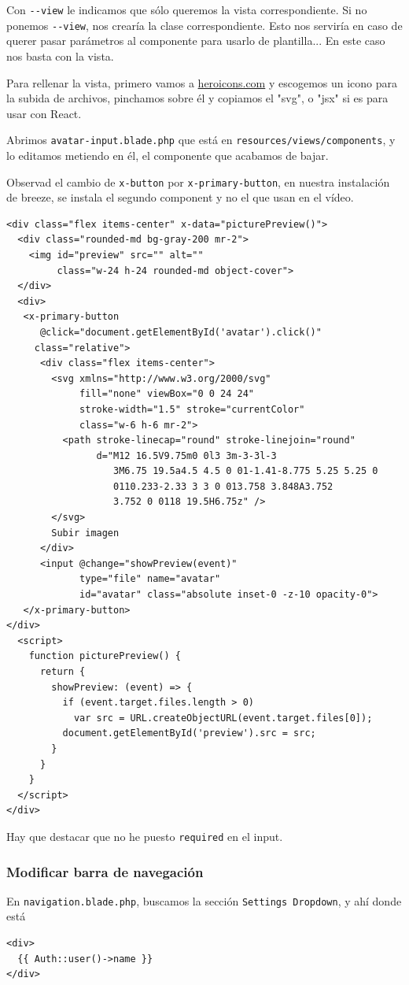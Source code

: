 \documentclass[11pt]{article}
\begin{document}
Con \texttt{-{}-{}view} le indicamos que sólo queremos la vista
correspondiente. Si no ponemos \texttt{-{}-{}view}, nos crearía la clase
correspondiente. Esto nos serviría en caso de querer pasar parámetros
al componente para usarlo de plantilla... En este caso nos basta con
la vista.

Para rellenar la vista, primero vamos a \href{https://heroicons.com/}{heroicons.com} y escogemos un
icono para la subida de archivos, pinchamos sobre él y copiamos el
"svg", o "jsx" si es para usar con React.

Abrimos \texttt{avatar-input.blade.php} que está en
\texttt{resources/views/components}, y lo editamos metiendo en él, el
componente que acabamos de bajar.

Observad el cambio de \texttt{x-button} por \texttt{x-primary-button}, en nuestra
instalación de breeze, se instala el segundo component y no el que
usan en el vídeo.

\begin{verbatim}
<div class="flex items-center" x-data="picturePreview()">
  <div class="rounded-md bg-gray-200 mr-2">
    <img id="preview" src="" alt=""
         class="w-24 h-24 rounded-md object-cover">
  </div>
  <div>
   <x-primary-button
      @click="document.getElementById('avatar').click()"
     class="relative">
      <div class="flex items-center">
        <svg xmlns="http://www.w3.org/2000/svg"
             fill="none" viewBox="0 0 24 24"
             stroke-width="1.5" stroke="currentColor"
             class="w-6 h-6 mr-2">
          <path stroke-linecap="round" stroke-linejoin="round"
                d="M12 16.5V9.75m0 0l3 3m-3-3l-3
                   3M6.75 19.5a4.5 4.5 0 01-1.41-8.775 5.25 5.25 0
                   0110.233-2.33 3 3 0 013.758 3.848A3.752
                   3.752 0 0118 19.5H6.75z" />
        </svg>
        Subir imagen
      </div>
      <input @change="showPreview(event)"
             type="file" name="avatar"
             id="avatar" class="absolute inset-0 -z-10 opacity-0">
   </x-primary-button>
</div>
  <script>
    function picturePreview() {
      return {
        showPreview: (event) => {
          if (event.target.files.length > 0)
            var src = URL.createObjectURL(event.target.files[0]);
          document.getElementById('preview').src = src;
        }
      }
    }
  </script>
</div>
\end{verbatim}
Hay que destacar que no he puesto \texttt{required} en el input.

\subsubsection{Modificar barra de navegación}
\label{sec:orgcb62364}
En \texttt{navigation.blade.php}, buscamos la sección \texttt{Settings Dropdown}, y
ahí donde está
\begin{verbatim}
<div>
  {{ Auth::user()->name }}
</div>
\end{verbatim}
\end{document}
